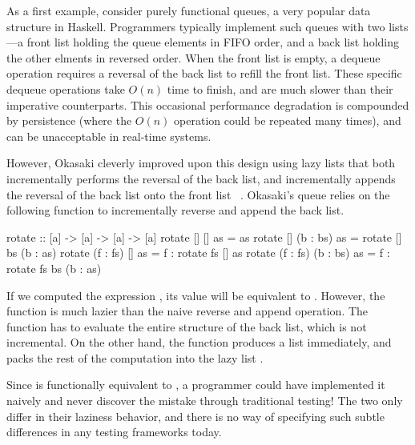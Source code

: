 \documentclass[acmsmall,review]{acmart}\settopmatter{}
\begin{document}

As a first example, consider purely functional queues, a very
popular data structure in Haskell. Programmers typically implement
such queues with two lists---a front list holding the queue elements
in FIFO order, and a back list holding the other elments in reversed
order. When the front list is empty, a dequeue operation requires a
reversal of the back list to refill the front list. These specific
dequeue operations take $O(n)$ time to finish, and are much slower
than their imperative counterparts. This occasional performance
degradation is compounded by persistence (where the $O(n)$ operation
could be repeated many times), and can be unacceptable in real-time
systems.

However, Okasaki cleverly improved upon this design using lazy lists
that both incrementally performs the reversal of the back list, and
incrementally appends the reversal of the back list onto the front
list ~\cite{Okasaki95simpleand}. Okasaki's queue relies on the
following  function to incrementally reverse and append the
back list.
\begin{inlinecode}
rotate :: [a] -> [a] -> [a] -> [a]
rotate      []       []  as =                       as
rotate      []  (b : bs) as =     rotate [] bs (b : as)
rotate (f : fs)      []  as = f : rotate fs []      as
rotate (f : fs) (b : bs) as = f : rotate fs bs (b : as)
\end{inlinecode}
If we computed the expression , its value
will be equivalent to . However, the
function  is much lazier than the naive reverse and append
operation. The function  has to evaluate the entire
structure of the back list, which is not incremental. On the other
hand, the function  produces a list immediately, and packs
the rest of the computation into the lazy list .

Since  is functionally equivalent to , a programmer could have implemented it naively and never
discover the mistake through traditional testing! The two only differ
in their laziness behavior, and there is no way of specifying such
subtle differences in any testing frameworks today.

\end{document}
